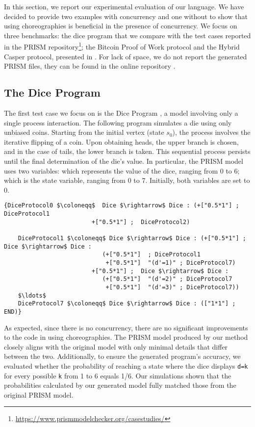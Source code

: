 In  this section, we report our experimental evaluation of our language. 
We have decided to provide two examples with concurrency and one without to show that using choreographies is beneficial in the presence of concurrency.
We focus on three benchmarks: the dice program that we compare with the  
test cases reported in the PRISM repository\footnote{\url{https://www.prismmodelchecker.org/casestudies/}}; 
the Bitcoin Proof of Work protocol and the Hybrid Casper protocol, 
presented in \cite{DBLP:journals/concurrency/BistarelliNGLMV23,DBLP:journals/distribledger/GallettaLMV23}.
For lack of space, we do not report the generated PRISM files, they can be found in the online repository \cite{repository}.

\subsection{The Dice Program}
 The first test case we focus on is the Dice Program \cite{KY76}, a model involving only a single process interaction. 
 The following program simulates a die using only unbiased coins. Starting from the initial vertex (state $s_0$), the process involves the iterative flipping of a coin. Upon obtaining heads, the upper branch is chosen, and in the case of tails, the lower branch is taken. This sequential process persists until the final determination of the die's value.
 In particular, the PRISM model uses two variables:  which represents the value of the dice, ranging from 0 to 6;  which is the state variable, ranging from 0 to 7.
 Initially, both variables are set to 0. 
 \vspace{-0.05cm}
 \begin{lstlisting}[style=chor-color,caption={Choreography for the Dice Program},captionpos=b,label={ex1-code}]
	{DiceProtocol0 $\coloneqq$  Dice $\rightarrow$ Dice : (+["0.5*1"] ; DiceProtocol1
						 +["0.5*1"] ;  DiceProtocol2)
	
	DiceProtocol1 $\coloneqq$ Dice $\rightarrow$ Dice : (+["0.5*1"] ; Dice $\rightarrow$ Dice : 
							(+["0.5*1"]  ; DiceProtocol1
							 +["0.5*1"]  "(d'=1)" ; DiceProtocol7)
					     +["0.5*1"] ;  Dice $\rightarrow$ Dice : 
							(+["0.5*1"]  "(d'=2)" ; DiceProtocol7
							 +["0.5*1"]  "(d'=3)" ; DiceProtocol7))
	$\ldots$
	DiceProtocol7 $\coloneqq$ Dice $\rightarrow$ Dice : (["1*1"] ; END)}
	\end{lstlisting}
   \vspace{-0.15cm}

As expected, since there is no concurrency, there are no significant improvements to the code in using choreographies.
The PRISM model produced by our method closely aligns with the original model with only minimal details that differ between the two.
Additionally, to ensure the generated program's accuracy, 
we evaluated whether the probability of reaching a state where the dice displays \texttt{d=k} for every possible \texttt{k} from 1 to 6 equals 1/6. Our simulations shown that the probabilities calculated by our generated model fully matched those from the original PRISM model. 

